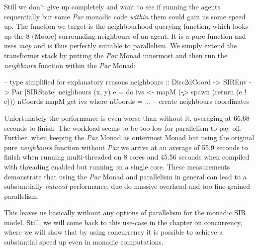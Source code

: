 Still we don't give up completely and want to see if running the agents sequentially but some \textit{Par} monadic code \textit{within} them could gain us some speed up. The function we target is the neighbourhood querying function, which looks up the 8 (Moore) surrounding neighbours of an agent. It is a pure function and uses \textit{map} and is thus perfectly suitable to parallelism. We simply extend the transformer stack by putting the \textit{Par} Monad innermost and then run the \textit{neighbours} function within the \textit{Par} Monad:

\begin{HaskellCode}
-- type simplified for explanatory reasons
neighbours :: Disc2dCoord -> SIREnv -> Par [SIRState]
neighbours (x, y) e = do
    ivs <- mapM (\c -> spawn (return (e ! c))) nCoords
    mapM get ivs
  where
    nCoords = ... -- create neighbours coordinates
\end{HaskellCode}

Unfortunately the performance is even worse than without it, averaging at 66.68 seconds to finish. The workload seems to be too low for parallelism to pay off. Further, when keeping the \textit{Par} Monad as outermost Monad but using the original pure \textit{neighbours} function without \textit{Par} we arrive at an average of 55.9 seconds to finish when running multi-threaded on 8 cores and 45.56 seconds when compiled with threading enabled but running on a single core. These measurements demonstrate that using the \textit{Par} Monad and parallelism in general can lead to a substantially \textit{reduced} performance, due do massive overhead and too fine-grained parallelism.

This leaves us basically without any options of parallelism for the monadic SIR model. Still, we will come back to this use-case in the chapter on concurrency, where we will show that by using concurrency it is possible to achieve a substantial speed up even in monadic computations.